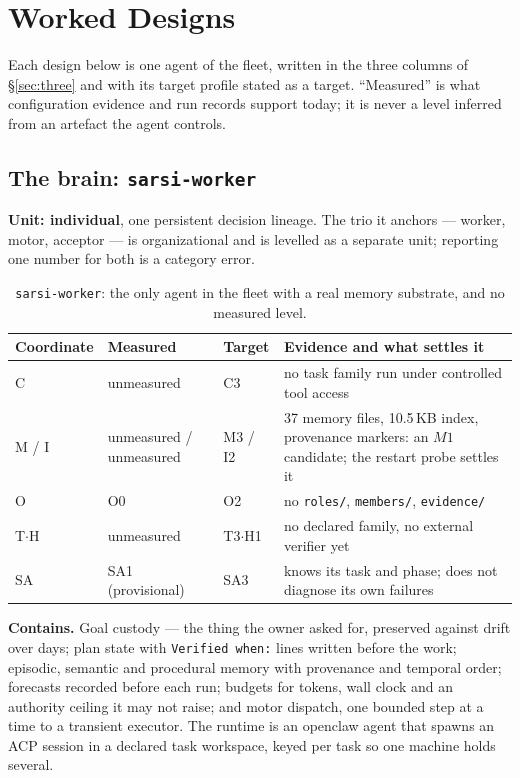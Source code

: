 \section{Worked Designs}\label{sec:designs}

Each design below is one agent of the fleet, written in the three columns of \S\ref{sec:three} and with its target profile stated as a target. ``Measured'' is what configuration evidence and run records support today; it is never a level inferred from an artefact the agent controls.

\subsection{The brain: \texttt{sarsi-worker}}\label{sec:worker}

\textbf{Unit: individual}, one persistent decision lineage. The trio it anchors --- worker, motor, acceptor --- is organizational and is levelled as a separate unit; reporting one number for both is a category error.

\begin{table}[H]
\centering\small
\begin{tabularx}{\textwidth}{@{}lllY@{}}
\toprule
Coordinate & Measured & Target & Evidence and what settles it \\
\midrule
C & unmeasured & C3 & no task family run under controlled tool access \\
M / I & unmeasured / unmeasured & M3 / I2 & 37 memory files, 10.5\,KB index, provenance markers: an $M1$ candidate; the restart probe settles it \\
O & O0 & O2 & no \texttt{roles/}, \texttt{members/}, \texttt{evidence/} \\
T$\cdot$H & unmeasured & T3$\cdot$H1 & no declared family, no external verifier yet \\
SA & SA1 (provisional) & SA3 & knows its task and phase; does not diagnose its own failures \\
\bottomrule
\end{tabularx}
\caption{\texttt{sarsi-worker}: the only agent in the fleet with a real memory substrate, and no measured level.}
\label{tab:worker}
\end{table}

\textbf{Contains.} Goal custody --- the thing the owner asked for, preserved against drift over days; plan state with \texttt{Verified when:} lines written before the work; episodic, semantic and procedural memory with provenance and temporal order; forecasts recorded before each run; budgets for tokens, wall clock and an authority ceiling it may not raise; and motor dispatch, one bounded step at a time to a transient executor. The runtime is an openclaw agent that spawns an ACP session in a declared task workspace, keyed per task so one machine holds several.

